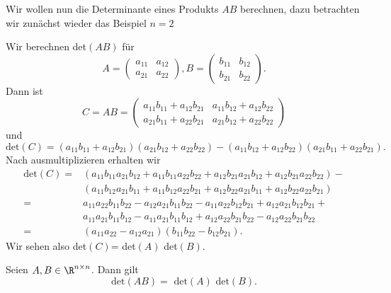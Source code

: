 \documentclass[letterpaper,10pt,english]{jupyterBook}
\begin{document}
Wir wollen nun die Determinante eines Produkts \(A B\) berechnen, dazu betrachten wir zunächst wieder das Beispiel \(n=2\)
\label{vektorraeume/LGS:example-16}
\begin{example}{}{}



Wir berechnen det\((AB)\) für
\begin{equation*}
 A = \left( \begin{matrix} a_{11} & a_{12} \\ a_{21} & a_{22}  \end{matrix} \right),  B = \left( \begin{matrix} b_{11} & b_{12} \\ b_{21} & b_{22}  \end{matrix} \right).
\end{equation*}
Dann ist
\begin{equation*}
 C = A B = \left( \begin{matrix} a_{11} b_{11} + a_{12} b_{21}   & a_{11} b_{12} + a_{12} b_{22} \\ a_{21} b_{11} + a_{22} b_{21}    & a_{21} b_{12} + a_{22} b_{22}   \end{matrix} \right)
\end{equation*}
und
\begin{equation*}
 \text{det}(C) = (a_{11} b_{11} + a_{12} b_{21}) (a_{21} b_{12} + a_{22} b_{22}) - (a_{11} b_{12} + a_{12} b_{22}) (a_{21} b_{11} + a_{22} b_{21}).
\end{equation*}
Nach ausmultiplizieren erhalten wir
\begin{align*}
  \text{det}(C) =& (a_{11} b_{11} a_{21} b_{12}  +  a_{11} b_{11} a_{22} b_{22} + a_{12} b_{21} a_{21} b_{12} +  a_{12} b_{21}a_{22} b_{22}) - \\& (a_{11} b_{12} a_{21} b_{11} + a_{11} b_{12}  a_{22} b_{21} + a_{12} b_{22} a_{21} b_{11} + a_{12} b_{22} a_{22} b_{21}) \\ =& a_{11} a_{22} b_{11}  b_{22} - a_{12} a_{21}   b_{11} b_{22}   -  a_{11} a_{22}  b_{12}  b_{21} +  a_{12}  a_{21} b_{12} b_{21}  +\\ &    a_{11} a_{21} b_{11}  b_{12} - a_{11} a_{21} b_{11}  b_{12}   +  a_{12} a_{22} b_{21} b_{22}  -  a_{12} a_{22} b_{21} b_{22}  \\=& (a_{11} a_{22} - a_{12} a_{21} )(b_{11}  b_{22}  - b_{12}  b_{21} ).
\end{align*}
Wir sehen also det\((C)\)= det\((A)\) det\((B)\).
\end{example}
\label{vektorraeume/LGS:theorem-17}
\begin{theorem}{}{}



Seien \(A,B \in \R^{n \times n}\). Dann gilt
\begin{equation*}
 \text{det}(AB) = \text{ det}(A) \text{ det}(B).
\end{equation*}\end{theorem}
\end{document}
